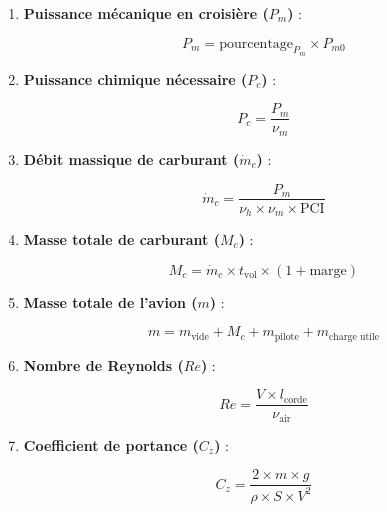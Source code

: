 \documentclass[12pt,a4paper]{article}
\begin{document}
\begin{enumerate}[label=\arabic*.]
    \item \textbf{Puissance mécanique en croisière ($P_m$)} :
    
    \begin{equation}
    P_m = \text{pourcentage}_{P_m} \times P_{m0}
    \end{equation}
    
    \item \textbf{Puissance chimique nécessaire ($P_c$)} :
    
    \begin{equation}
    P_c = \dfrac{P_m}{\nu_m}
    \end{equation}
    
    \item \textbf{Débit massique de carburant ($\dot{m}_c$)} :
    
    \begin{equation}
    \dot{m}_c = \dfrac{P_m}{\nu_h \times \nu_m \times \text{PCI}}
    \end{equation}
    
    \item \textbf{Masse totale de carburant ($M_c$)} :
    
    \begin{equation}
    M_c = \dot{m}_c \times t_{\text{vol}} \times (1 + \text{marge})
    \end{equation}
    
    \item \textbf{Masse totale de l'avion ($m$)} :
    
    \begin{equation}
    m = m_{\text{vide}} + M_c + m_{\text{pilote}} + m_{\text{charge utile}}
    \end{equation}
    
    \item \textbf{Nombre de Reynolds ($Re$)} :
    
    \begin{equation}
    Re = \dfrac{V \times l_{\text{corde}}}{\nu_{\text{air}}}
    \end{equation}
    
    \item \textbf{Coefficient de portance ($C_z$)} :
    
    \begin{equation}
    C_z = \dfrac{2 \times m \times g}{\rho \times S \times V^2}
    \end{equation}
    

\end{enumerate}
\end{document}

